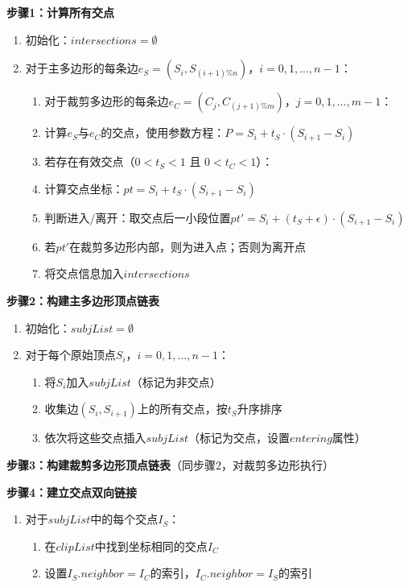 \documentclass[12pt,a4paper]{article}
\begin{document}
\begin{tcolorbox}
\textbf{步骤1：计算所有交点}
\begin{enumerate}
    \item 初始化：$intersections = \emptyset$
    \item 对于主多边形的每条边$e_S = (S_i, S_{(i+1)\%n})$，$i = 0, 1, ..., n-1$：
    \begin{enumerate}
        \item 对于裁剪多边形的每条边$e_C = (C_j, C_{(j+1)\%m})$，$j = 0, 1, ..., m-1$：
        \item 计算$e_S$与$e_C$的交点，使用参数方程：$P = S_i + t_S \cdot (S_{i+1} - S_i)$
        \item 若存在有效交点（$0 < t_S < 1$ 且 $0 < t_C < 1$）：
        \item \quad 计算交点坐标：$pt = S_i + t_S \cdot (S_{i+1} - S_i)$
        \item \quad 判断进入/离开：取交点后一小段位置$pt' = S_i + (t_S + \epsilon) \cdot (S_{i+1} - S_i)$
        \item \quad 若$pt'$在裁剪多边形内部，则为进入点；否则为离开点
        \item \quad 将交点信息加入$intersections$
    \end{enumerate}
\end{enumerate}

\textbf{步骤2：构建主多边形顶点链表}
\begin{enumerate}
    \item 初始化：$subjList = \emptyset$
    \item 对于每个原始顶点$S_i$，$i = 0, 1, ..., n-1$：
    \begin{enumerate}
        \item 将$S_i$加入$subjList$（标记为非交点）
        \item 收集边$(S_i, S_{i+1})$上的所有交点，按$t_S$升序排序
        \item 依次将这些交点插入$subjList$（标记为交点，设置$entering$属性）
    \end{enumerate}
\end{enumerate}

\textbf{步骤3：构建裁剪多边形顶点链表}（同步骤2，对裁剪多边形执行）

\textbf{步骤4：建立交点双向链接}
\begin{enumerate}
    \item 对于$subjList$中的每个交点$I_S$：
    \begin{enumerate}
        \item 在$clipList$中找到坐标相同的交点$I_C$
        \item 设置$I_S.neighbor = I_C$的索引，$I_C.neighbor = I_S$的索引
    \end{enumerate}
\end{enumerate}


\end{tcolorbox}
\end{document}
